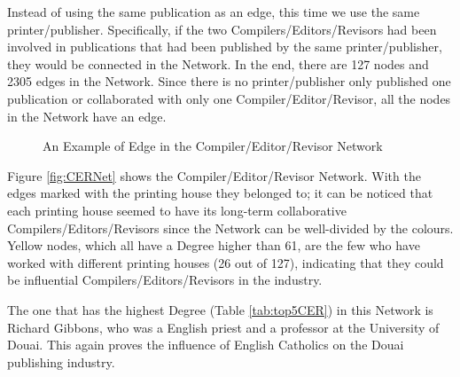 \documentclass[12pt,a4paper,oneside]{book}
\begin{document}
\begin{sloppypar}
Instead of using the same publication as an edge, this time we use the same printer/publisher. Specifically, if the two Compilers/Editors/Revisors had been involved in publications that had been published by the same printer/publisher, they would be connected in the Network. In the end, there are 127 nodes and 2305 edges in the Network. Since there is no printer/publisher only published one publication or collaborated with only one Compiler/Editor/Revisor, all the nodes in the Network have an edge.

\begin{figure}[H]
\centering

\caption{An Example of Edge in the Compiler/Editor/Revisor Network}
\label{fig:exampleCERNet}
\end{figure}

Figure \ref{fig:CERNet} shows the Compiler/Editor/Revisor Network. With the edges marked with the printing house they belonged to; it can be noticed that each printing house seemed to have its long-term collaborative Compilers/Editors/Revisors since the Network can be well-divided by the colours. Yellow nodes, which all have a Degree higher than 61, are the few who have worked with different printing houses (26 out of 127), indicating that they could be influential Compilers/Editors/Revisors in the industry.

The one that has the highest Degree (Table \ref{tab:top5CER}) in this Network is Richard Gibbons, who was a English priest and a professor at the University of Douai. This again proves the influence of English Catholics on the Douai publishing industry.

\begin{table}[H]
\centering
\caption{Top 5 Degrees in the Compiler/Editor/Revisor Network}
\label{tab:top5CER}
\end{table}


\end{sloppypar}
\end{document}
